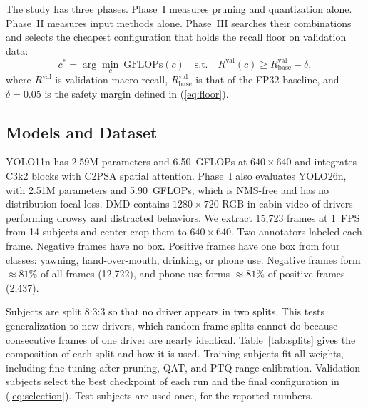 \documentclass[conference]{IEEEtran}
\begin{document}
The study has three phases. Phase~I measures pruning and quantization alone. Phase~II measures input methods alone. Phase~III searches their combinations and selects the cheapest configuration that holds the recall floor on validation data:
\begin{equation}
\label{eq:selection}
c^{*} = \arg\min_{c}\ \mathrm{GFLOPs}(c)
\quad \text{s.t.} \quad
R^{\text{val}}(c) \geq R^{\text{val}}_{\text{base}} - \delta,
\end{equation}
where $R^{\text{val}}$ is validation macro-recall, $R^{\text{val}}_{\text{base}}$ is that of the FP32 baseline, and $\delta=0.05$ is the safety margin defined in (\ref{eq:floor}).

\subsection{Models and Dataset}
\label{sec:data}
YOLO11n has 2.59M parameters and 6.50~GFLOPs at $640\times640$ and integrates C3k2 blocks with C2PSA spatial attention. Phase~I also evaluates YOLO26n, with 2.51M parameters and 5.90~GFLOPs, which is NMS-free and has no distribution focal loss. DMD contains $1280\times720$ RGB in-cabin video of drivers performing drowsy and distracted behaviors. We extract 15{,}723 frames at 1~FPS from 14 subjects and center-crop them to $640\times640$. Two annotators labeled each frame. Negative frames have no box. Positive frames have one box from four classes: yawning, hand-over-mouth, drinking, or phone use. Negative frames form $\approx81\%$ of all frames (12{,}722), and phone use forms $\approx81\%$ of positive frames (2{,}437).

Subjects are split 8:3:3 so that no driver appears in two splits. This tests generalization to new drivers, which random frame splits cannot do because consecutive frames of one driver are nearly identical. Table~\ref{tab:splits} gives the composition of each split and how it is used. Training subjects fit all weights, including fine-tuning after pruning, QAT, and PTQ range calibration. Validation subjects select the best checkpoint of each run and the final configuration in (\ref{eq:selection}). Test subjects are used once, for the reported numbers.
\end{document}
